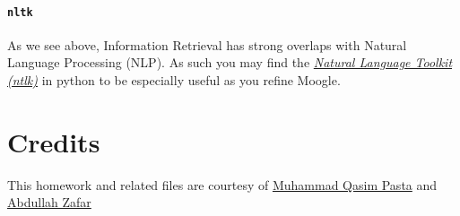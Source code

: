 \documentclass[addpoints]{exam}
\begin{document}
\paragraph{\texttt{nltk}} As we see above, Information Retrieval has strong overlaps with Natural Language Processing (NLP). As such you may find the \href{https://www.nltk.org}{\textit{Natural Language Toolkit (ntlk)}} in python to be especially useful as you refine Moogle.


\section*{Credits}

This homework and related files are courtesy of \href{http://qasimpasta.info}{Muhammad Qasim Pasta} and \href{https://www.facebook.com/abdullah.zafar.547389}{Abdullah Zafar}
\end{document}
